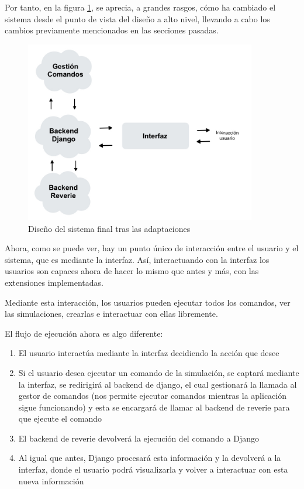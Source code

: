 Por tanto, en la figura \ref{fig:sistemaFinal}, se aprecia, a grandes rasgos, cómo ha cambiado el sistema desde el punto de vista del diseño a alto nivel, llevando a cabo los cambios previamente mencionados en las secciones pasadas.

\begin{figure}[h]
	\centering
	\includegraphics[width = 0.9\textwidth]{Imagenes/Vectorial/disenoSistemaFinal.jpeg}
	\caption{Diseño del sistema final tras las adaptaciones}
	\label{fig:sistemaFinal}
\end{figure}

Ahora, como se puede ver, hay un punto único de interacción entre el usuario y el sistema, que es mediante la interfaz. Así, interactuando con la interfaz los usuarios son capaces ahora de hacer lo mismo que antes y más, con las extensiones implementadas.

Mediante esta interacción, los usuarios pueden ejecutar todos los comandos, ver las simulaciones, crearlas e interactuar con ellas libremente.

El flujo de ejecución ahora es algo diferente:

\begin{enumerate}
	\item El usuario interactúa mediante la interfaz decidiendo la acción que desee
	
	\item Si el usuario desea ejecutar un comando de la simulación, se captará mediante la interfaz, se redirigirá al backend de django, el cual gestionará la llamada al gestor de comandos (nos permite ejecutar comandos mientras la aplicación sigue funcionando) y esta se encargará de llamar al backend de reverie para que ejecute el comando
	
	\item El backend de reverie devolverá la ejecución del comando a Django
	
	\item Al igual que antes, Django procesará esta información y la devolverá a la interfaz, donde el usuario podrá visualizarla y volver a interactuar con esta nueva información
	
\end{enumerate}
